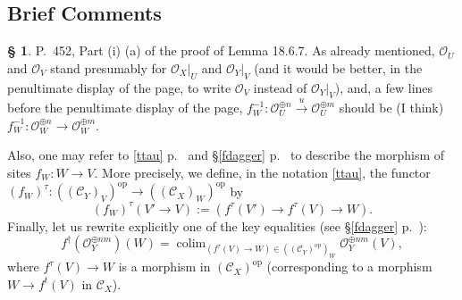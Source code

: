 \documentclass[12pt]{article}%
\theoremstyle{remark}
\theoremstyle{definition}
\newtheorem{s}[thm]{\S}%
\newcommand{\cc}{\mathcal}
\newcommand{\C}{\mathcal C}
\newcommand{\xr}{\xrightarrow}
\DeclareMathOperator*{\colim}{colim}%
\DeclareMathOperator{\op}{op}
\begin{document}

\subsection{Brief Comments} 

\begin{s}
P.~452, Part (i) (a) of the proof of Lemma 18.6.7. As already mentioned, $\cc O_U$ and $\cc O_V$ stand presumably for $\cc O_X|_U$ and $\cc O_Y|_V$ (and it would be better, in the penultimate display of the page, to write $\cc O_V$ instead of $\cc O_Y|_V$), and, a few lines before the penultimate display of the page, $f_W^{-1}:\cc O_U^{\oplus n}\xr u\cc O_U^{\oplus m}$ should be (I think) $f_W^{-1}:\cc O_W^{\oplus n}\to\cc O_W^{\oplus m}$. 

Also, one may refer to \eqref{ttau} p.~\pageref{ttau} and \S\ref{fdagger} p.~\pageref{fdagger} to describe the morphism of sites $f_W:W\to V$. More precisely, we define, in the notation \eqref{ttau}, the functor $(f_W)^\tau:((\C_Y)_V)^{\op}\to((\C_X)_W)^{\op}$ by
$$
(f_W)^\tau(V'\to V):=(f^\tau(V')\to f^\tau(V)\to W).
$$
Finally, let us rewrite explicitly one of the key equalities (see \S\ref{fdagger} p.~\pageref{fdagger}): 
$$
f^\dagger(\cc O_Y^{\oplus nm})(W)=\colim_{(f^\tau(V)\to W)\in((\C_Y)^{\op})_W}\cc O_Y^{\oplus nm}(V),
$$ 
where $f^\tau(V)\to W$ is a morphism in $(\C_X)^{\op}$ (corresponding to a morphism $W\to f^t(V)$ in $\C_X$).
\end{s}
\printindex
\end{document}
